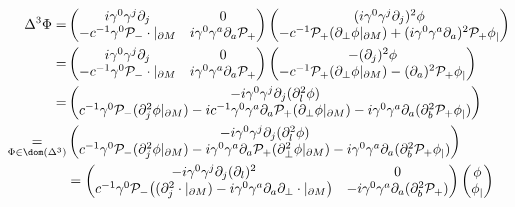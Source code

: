 \begin{equation*}
\begin{split}
\Delta^3 \Phi  = &
\begin{pmatrix} i\gamma^0\gamma^j\partial_j & 0 \\ 
-c^{-1}\gamma^0 \mathcal{P}_- \cdot \vert_{\partial M} & i\gamma^0\gamma^a\partial_a \mathcal{P}_+ \end{pmatrix} 
\begin{pmatrix} (i\gamma^0\gamma^j\partial_j)^2 \phi \\
-c^{-1}\mathcal{P}_+ (\partial_\bot \phi\vert_{\partial M}) + (i\gamma^0\gamma^a\partial_a)^2 \mathcal{P}_+ \phi_| \end{pmatrix} \\ 
= & \begin{pmatrix} i\gamma^0\gamma^j \partial_j& 0 \\ 
-c^{-1}\gamma^0 \mathcal{P}_- \cdot \vert_{\partial M} & i\gamma^0\gamma^a\partial_a \mathcal{P}_+ \end{pmatrix} 
\begin{pmatrix} -(\partial_j)^2 \phi \\
-c^{-1}\mathcal{P}_+ (\partial_\bot \phi\vert_{\partial M}) - (\partial_a)^2 \mathcal{P}_+ \phi_| \end{pmatrix} \\ 
= &
\begin{pmatrix} -  i\gamma^0\gamma^j\partial_j(\partial_l^2 \phi ) \\
c^{-1}\gamma^0\mathcal{P}_-(\partial_j^2\phi\vert_{\partial M}) - ic^{-1}\gamma^0\gamma^a\partial_a \mathcal{P}_+(\partial_\bot \phi\vert_{\partial M})  -i\gamma^0\gamma^a\partial_a(\partial_b^2 \mathcal{P}_+\phi_| )\end{pmatrix} \\ 
\underset{\Phi \in \dom(\Delta^3)}{= }&
 \begin{pmatrix} - i\gamma^0\gamma^j\partial_j(\partial_l^2 \phi ) \\
c^{-1}\gamma^0\mathcal{P}_-(\partial_j^2\phi\vert_{\partial M}) 
- i\gamma^0\gamma^a\partial_a \mathcal{P}_+(\partial^2_\bot \phi\vert_{\partial M}) - i\gamma^0\gamma^a\partial_a(\partial_b^2 \mathcal{P}_+\phi_| )\end{pmatrix} \\ 
& = \begin{pmatrix} -i\gamma^0\gamma^j\partial_j (\partial_l)^2  & 0\\
c^{-1}\gamma^0 \mathcal{P}_- \big( (\partial_j^2 \cdot\vert_{\partial M}) - i\gamma^0\gamma^a\partial_a\partial_\bot\cdot\vert_{\partial M} \big)
 & -i\gamma^0\gamma^a\partial_a(\partial_b^2 \mathcal{P}_+)\end{pmatrix}
\begin{pmatrix}
\phi \\ \phi_|
\end{pmatrix}
\end{split}
\end{equation*}

